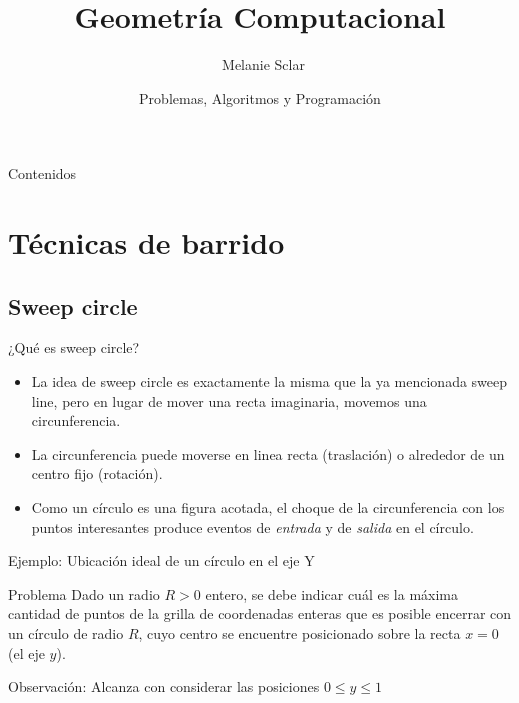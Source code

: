 \documentclass[compress]{beamer}
\title[Geometr\'ia Computacional] %
{Geometr\'ia Computacional}
\author[Melanie Sclar] %
{~Melanie Sclar}
\institute[UBA] %
{
  Facultad de Ciencias Exactas y Naturales\\
  Universidad de Buenos Aires
}
\date[PAP] %
{Problemas, Algoritmos y Programación}
\begin{document}
\begin{frame}
  \titlepage
\end{frame}

\begin{frame}{Contenidos}
  \tableofcontents
\end{frame}

\section{Técnicas de barrido}
\subsection{Sweep circle}

\begin{frame}{¿Qu\'e es sweep circle?}
\begin{itemize}
\item La idea de sweep circle es exactamente la misma que la ya mencionada sweep line, pero en lugar de mover una recta imaginaria, movemos una circunferencia.

\item La circunferencia puede moverse en linea recta (traslación) o alrededor de un centro fijo (rotación).

\item Como un círculo es una figura acotada, el choque de la circunferencia con los puntos interesantes produce eventos de \textit{entrada} y de \textit{salida} en el círculo.
\end{itemize}
\end{frame}

\begin{frame}{Ejemplo: Ubicación ideal de un círculo en el eje Y}

\begin{block}{Problema}
    Dado un radio $R > 0$ entero, se debe indicar cuál es la máxima cantidad de puntos de la grilla de coordenadas enteras que es posible encerrar con un círculo de radio $R$, cuyo centro se encuentre posicionado sobre la recta $x=0$ (el eje $y$).
\end{block}

\pause
{}
{
    Observación: Alcanza con considerar las posiciones $0 \leq y \leq 1$
}

\end{frame}
\end{document}
